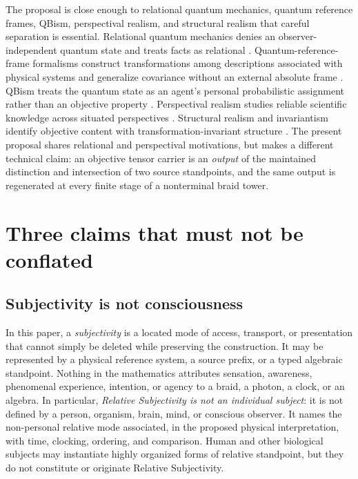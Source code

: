 \documentclass[11pt]{article}
\theoremstyle{definition}
\theoremstyle{remark}
\begin{document}
The proposal is close enough to relational quantum mechanics, quantum reference frames, QBism, perspectival realism, and structural realism that careful separation is essential. Relational quantum mechanics denies an observer-independent quantum state and treats facts as relational \cite{rovelli1996}. Quantum-reference-frame formalisms construct transformations among descriptions associated with physical systems and generalize covariance without an external absolute frame \cite{giacomini2019,vanrietvelde2020}. QBism treats the quantum state as an agent's personal probabilistic assignment rather than an objective property \cite{fuchs2013}. Perspectival realism studies reliable scientific knowledge across situated perspectives \cite{massimi2022,massimi2023}. Structural realism and invariantism identify objective content with transformation-invariant structure \cite{weyl1952,ladyman1998}. The present proposal shares relational and perspectival motivations, but makes a different technical claim: an objective tensor carrier is an \emph{output} of the maintained distinction and intersection of two source standpoints, and the same output is regenerated at every finite stage of a nonterminal braid tower.

\section{Three claims that must not be conflated}

\subsection{Subjectivity is not consciousness}

In this paper, a \emph{subjectivity} is a located mode of access, transport, or presentation that cannot simply be deleted while preserving the construction. It may be represented by a physical reference system, a source prefix, or a typed algebraic standpoint. Nothing in the mathematics attributes sensation, awareness, phenomenal experience, intention, or agency to a braid, a photon, a clock, or an algebra. In particular, \emph{Relative Subjectivity is not an individual subject}: it is not defined by a person, organism, brain, mind, or conscious observer. It names the non-personal relative mode associated, in the proposed physical interpretation, with time, clocking, ordering, and comparison. Human and other biological subjects may instantiate highly organized forms of relative standpoint, but they do not constitute or originate Relative Subjectivity.
\end{document}
